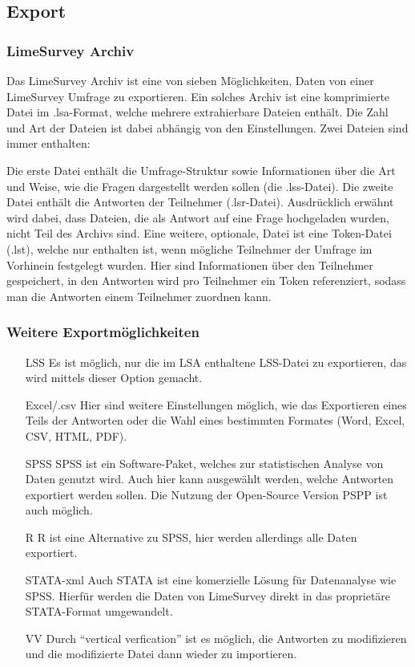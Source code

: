 \subsection{Export}
\subsubsection{LimeSurvey Archiv}
\label{m:lsa}
Das LimeSurvey Archiv ist eine von sieben Möglichkeiten, Daten von einer LimeSurvey Umfrage zu exportieren.
Ein solches Archiv ist eine komprimierte Datei im .lsa-Format, welche mehrere extrahierbare Dateien enthält.
Die Zahl und Art der Dateien ist dabei abhängig von den Einstellungen. Zwei Dateien sind immer enthalten:

Die erste Datei enthält die Umfrage-Struktur sowie Informationen über die Art und Weise, wie die Fragen dargestellt werden sollen (die .lss-Datei).
Die zweite Datei enthält die Antworten der Teilnehmer (.lsr-Datei).
Ausdrücklich erwähnt wird dabei, dass Dateien, die als Antwort auf eine Frage hochgeladen wurden, nicht Teil des Archivs sind.
Eine weitere, optionale, Datei ist eine Token-Datei (.lst), welche nur enthalten ist, wenn mögliche Teilnehmer der Umfrage im Vorhinein festgelegt wurden.
Hier sind Informationen über den Teilnehmer gespeichert, in den Antworten wird pro Teilnehmer ein Token referenziert, sodass man die Antworten einem Teilnehmer zuordnen kann.

\subsubsection{Weitere Exportmöglichkeiten}
\begin{itemize}
	\item[LSS] Es ist möglich, nur die im LSA enthaltene LSS-Datei zu exportieren, das wird mittels dieser Option gemacht.
	\item[Excel/.csv] Hier sind weitere Einstellungen möglich, wie das Exportieren eines Teils der Antworten oder die Wahl eines bestimmten Formates (Word, Excel, CSV, HTML, PDF).
	\item[SPSS] SPSS ist ein Software-Paket, welches zur statistischen Analyse von Daten genutzt wird. Auch hier kann ausgewählt werden, welche Antworten exportiert werden sollen. Die Nutzung der Open-Source Version PSPP ist auch möglich.
	\item[R] R ist eine Alternative zu SPSS, hier werden allerdings alle Daten exportiert.
	\item[STATA-xml] Auch STATA ist eine komerzielle Lösung für Datenanalyse wie SPSS. Hierfür werden die Daten von LimeSurvey direkt in das proprietäre STATA-Format umgewandelt.
	\item[VV] Durch \enquote{vertical verfication} ist es möglich, die Antworten zu modifizieren und die modifizierte Datei dann wieder zu importieren.
\end{itemize}

